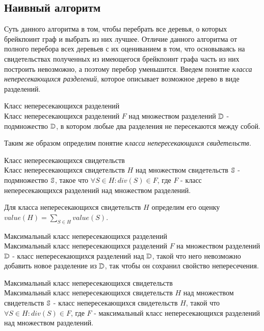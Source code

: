 \subsection{Наивный алгоритм}
Суть данного алгоритма в том, чтобы перебрать все деревья, о которых  брейкпоинт граф и выбрать из них лучшее.
Отличие данного алгоритма от полного перебора всех деревьев с их оцениванием в том,
что основываясь на свидетельствах полученных из имеющегося брейкпоинт графа часть из них построить невозможно, а поэтому
перебор уменьшится.
Введем понятие \textit{класса непересекающихся разделений}, которое описывает возможное дерево в виде разделений.
\begin{define}{Класс непересекающихся разделений} \\
  Класс непересекающихся разделений $F$ над множеством разделений $\mathbb{D}$ - подмножество $\mathbb{D}$,
  в котором любые два разделения не пересекаются между собой.
\end{define}

\noindent Таким же образом определим понятие \textit{класса непересекающихся свидетельств}.
\begin{define}{Класс непересекающихся свидетельств}\\
  Класс непересекающихся свидетельств $H$ над множеством свидетельств $\mathbb{S}$ - подмножество $\mathbb{S}$,
  такое что $\forall S \in H: div(S) \in F$,
  где $F$ -  класс непересекающихся разделений над множеством разделений.
\end{define}

\noindent Для класса непересекающихся свидетельств $H$ определим его оценку \\
$value(H) = \sum\nolimits_{S \in H} value(S)$.

\begin{define}{Максимальный класс непересекающихся разделений} \\
  Максимальный класс непересекающихся разделений $F$ на множеством разделений $\mathbb{D}$ -
  класс непересекающихся разделений над $\mathbb{D}$, такой что него невозможно добавить новое разделение из $\mathbb{D}$,
  так чтобы он сохранил свойство непересечения.
\end{define}

\begin{define}{Максимальный класс непересекающихся свидетельств} \\
  Максимальный класс непересекающихся свидетельств $H$ над множеством свидетельств $\mathbb{S}$ - класс непересекающихся свидетельств $H$,
  такой что $\forall S \in H: div(S) \in F$,
  где $F$ - максимальный класс непересекающихся разделений над множеством разделений.
\end{define}

